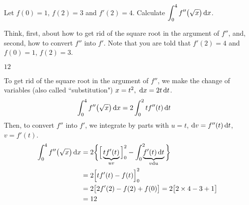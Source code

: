 \begin{Mquestion}[M105 2013A]
Let $f(0) = 1$, $f(2) = 3$ and $f'(2) = 4$.
Calculate
${\displaystyle\int_0^4 f''\big(\sqrt{x}\big)\,\mathrm{d}x}$.
\end{Mquestion}

\begin{hint}
Think, first, about how to get rid of the square root in the argument of $f''$,
and, second, how to convert $f''$ into $f'$. Note that you are told that $f'(2) = 4$
and $f(0) = 1$, $f(2) = 3$.
\end{hint}

\begin{answer}
$12$
\end{answer}

\begin{solution}
To get rid of the square root in the argument of $f''$, we make the change of variables (also called ``substitution")
$x=t^2,\ \mathrm{d}x=2t\,\mathrm{d}t$.
\begin{align*}
\int_0^4 f''\big(\sqrt{x}\big)\,\mathrm{d}x
&= 2\int_0^2 tf''(t)\,\mathrm{d}t
\end{align*}
Then, to convert $f''$ into $f'$, we  integrate by parts with
$u=t$,  $\mathrm{d}v=f''(t)\,\mathrm{d}t$,    $v=f'(t) $.
\begin{align*}
\int_0^4 f''\big(\sqrt{x}\big)\,\mathrm{d}x
&= 2\bigg\{\Big[\underbrace{tf'(t)}_{uv}\Big]_0^2-\int_0^2\!\!\!\underbrace{ f'(t)\,\mathrm{d}t}_{v\mathrm{d}u}\bigg\} \\
&=2\Big[tf'(t)-f(t)\Big]_0^2 \\
&=2\big[2f'(2)-f(2)+f(0)\big]=2\big[2\times 4-3+1\big]\\
&=12
\end{align*}


\end{solution}

